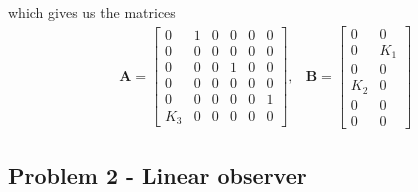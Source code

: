 which gives us the matrices
\begin{align}\label{eq:state_matrices_P4p1}
    &\mathbf{A} = \begin{bmatrix}
        0 & 1 & 0 & 0 & 0 & 0 \\
        0 & 0 & 0 & 0 & 0 & 0 \\
        0 & 0 & 0 & 1 & 0 & 0 \\
        0 & 0 & 0 & 0 & 0 & 0 \\
        0 & 0 & 0 & 0 & 0 & 1 \\
        K_3 & 0 & 0 & 0 & 0 & 0
    \end{bmatrix}, 
    &\mathbf{B} = 
    \begin{bmatrix}
        0 & 0 \\
        0 & K_1 \\
        0 & 0 \\
        K_2 & 0 \\
        0 & 0 \\
        0 & 0 
    \end{bmatrix}
\end{align}

\subsection{Problem 2 - Linear observer}\label{subsec:P4p2}

